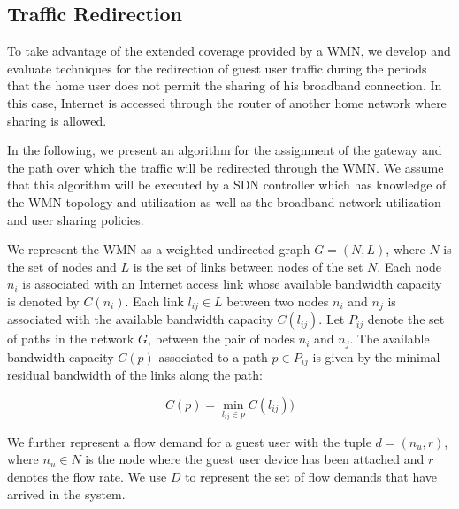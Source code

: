 \subsection{Traffic Redirection}
\label{architecture:redirection}

To take advantage of the extended coverage provided by a WMN, we develop and evaluate techniques for the redirection of guest user traffic during the periods that the home user does not permit the sharing of his broadband connection. In this case, Internet is accessed through the router of another home network where sharing is allowed. 

In the following, we present an algorithm for the assignment of the gateway and the path over which the traffic will be redirected through the WMN. We assume that this algorithm will be executed by a SDN controller which has knowledge of the WMN topology and utilization as well as the broadband network utilization and user sharing policies. 

We represent the WMN as a weighted undirected graph $G = (N, L)$, where $N$ is the set of nodes and $L$ is the set of links between nodes of the set $N$. Each node $n_i$ is associated with an Internet access link whose available bandwidth capacity is denoted by $C(n_i)$. Each link $l_{ij} \in L$ between two nodes $n_i$ and $n_j$ is associated with the available bandwidth capacity $C(l_{ij})$. Let $P_{ij}$ denote the set of paths in the network $G$, between the pair of nodes $n_i$ and $n_j$. The available bandwidth capacity $C(p)$ associated to a path $p \in P_{ij}$ is given by the minimal residual bandwidth of the links along the path:

\begin{equation}
C(p) = \min_{l_{ij} \in p} C(l_{ij}))
\end{equation}


We further represent a flow demand for a guest user with the tuple $d = (n_u, r)$, where $n_u \in N$ is the node where the guest user device has been attached and $r$ denotes the flow rate. We use $D$ to represent the set of flow demands that have arrived in the system.

